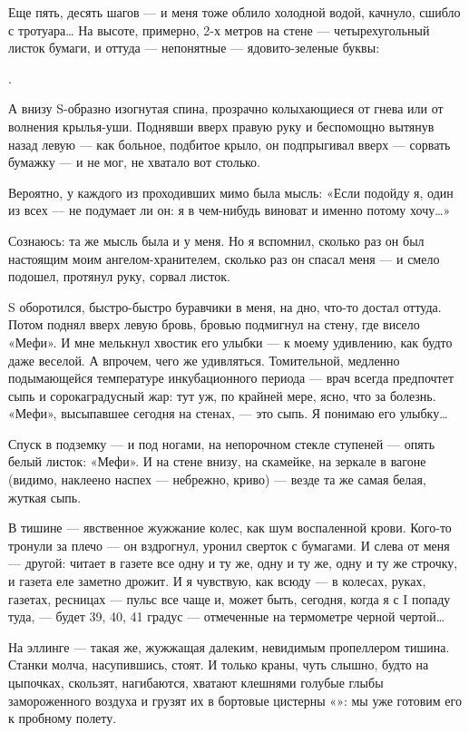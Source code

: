 \documentclass[11pt,openany]{book}
\begin{document}
Еще пять, десять шагов --- и меня тоже облило холодной водой, качнуло, сшибло с тротуара\ldots{} На высоте, примерно, 2-х метров на стене --- четырехугольный листок бумаги, и оттуда --- непонятные --- ядовито-зеленые буквы:

.

А внизу S-образно изогнутая спина, прозрачно колыхающиеся от гнева или от волнения крылья-уши. Поднявши вверх правую руку и беспомощно вытянув назад левую --- как больное, подбитое крыло, он подпрыгивал вверх --- сорвать бумажку --- и не мог, не хватало вот столько.

Вероятно, у каждого из проходивших мимо была мысль: «Если подойду я, один из всех --- не подумает ли он: я в чем-нибудь виноват и именно потому хочу\ldots{}»

Сознаюсь: та же мысль была и у меня. Но я вспомнил, сколько раз он был настоящим моим ангелом-хранителем, сколько раз он спасал меня --- и смело подошел, протянул руку, сорвал листок.

S оборотился, быстро-быстро буравчики в меня, на дно, что-то достал оттуда. Потом поднял вверх левую бровь, бровью подмигнул на стену, где висело «Мефи». И мне мелькнул хвостик его улыбки --- к моему удивлению, как будто даже веселой. А впрочем, чего же удивляться. Томительной, медленно подымающейся температуре инкубационного периода --- врач всегда предпочтет сыпь и сорокаградусный жар: тут уж, по крайней мере, ясно, что за болезнь. «Мефи», высыпавшее сегодня на стенах, --- это сыпь. Я понимаю его улыбку\ldots{}

Спуск в подземку --- и под ногами, на непорочном стекле ступеней --- опять белый листок: «Мефи». И на стене внизу, на скамейке, на зеркале в вагоне (видимо, наклеено наспех --- небрежно, криво) --- везде та же самая белая, жуткая сыпь.

В тишине --- явственное жужжание колес, как шум воспаленной крови. Кого-то тронули за плечо --- он вздрогнул, уронил сверток с бумагами. И слева от меня --- другой: читает в газете все одну и ту же, одну и ту же, одну и ту же строчку, и газета еле заметно дрожит. И я чувствую, как всюду --- в колесах, руках, газетах, ресницах --- пульс все чаще и, может быть, сегодня, когда я с I попаду туда, --- будет 39, 40, 41 градус --- отмеченные на термометре черной чертой\ldots{}

На эллинге --- такая же, жужжащая далеким, невидимым пропеллером тишина. Станки молча, насупившись, стоят. И только краны, чуть слышно, будто на цыпочках, скользят, нагибаются, хватают клешнями голубые глыбы замороженного воздуха и грузят их в бортовые цистерны «»: мы уже готовим его к пробному полету.
\end{document}
